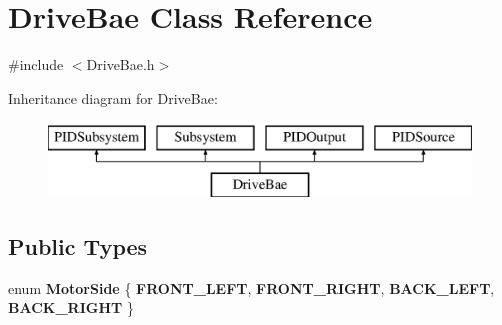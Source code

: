 \hypertarget{class_drive_bae}{}\section{Drive\+Bae Class Reference}
\label{class_drive_bae}


{\ttfamily \#include $<$Drive\+Bae.\+h$>$}

Inheritance diagram for Drive\+Bae\+:\begin{figure}[H]
\begin{center}
\leavevmode
\includegraphics[height=2.000000cm]{class_drive_bae}
\end{center}
\end{figure}
\subsection*{Public Types}
\begin{DoxyCompactItemize}
\item 
\hypertarget{class_drive_bae_a5a16264d8b3e1c0b913d213f194f36a9}{}enum {\bfseries Motor\+Side} \{ {\bfseries F\+R\+O\+N\+T\+\_\+\+L\+E\+F\+T}, 
{\bfseries F\+R\+O\+N\+T\+\_\+\+R\+I\+G\+H\+T}, 
{\bfseries B\+A\+C\+K\+\_\+\+L\+E\+F\+T}, 
{\bfseries B\+A\+C\+K\+\_\+\+R\+I\+G\+H\+T}
 \}\label{class_drive_bae_a5a16264d8b3e1c0b913d213f194f36a9}

\end{DoxyCompactItemize}
